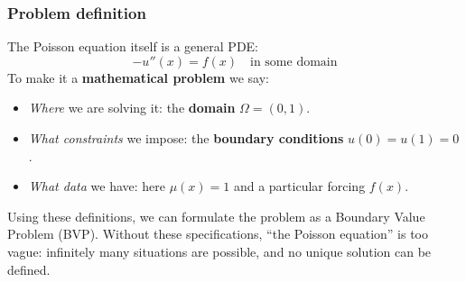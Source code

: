 \subsubsection{Problem definition}

The Poisson equation itself is a general PDE:
\begin{equation*}
    - u''(x) = f(x) \quad \text{in some domain}
\end{equation*}
To make it a \textbf{mathematical problem} we say:
\begin{itemize}
    \item \emph{Where} we are solving it: the \textbf{domain} $\Omega = (0, 1)$.
    \item \emph{What constraints} we impose: the \textbf{boundary conditions} $u(0) = u(1) = 0$.
    \item \emph{What data} we have: here $\mu(x) = 1$ and a particular forcing $f(x)$.
\end{itemize}
Using these definitions, we can formulate the problem as a Boundary Value Problem (BVP). Without these specifications, ``the Poisson equation'' is too vague: infinitely many situations are possible, and no unique solution can be defined.

